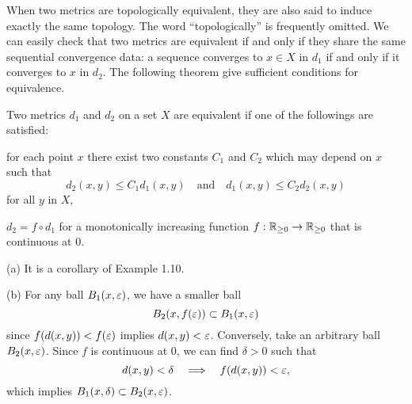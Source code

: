 \documentclass{../note}
\begin{document}
When two metrics are topologically equivalent, they are also said to induce exactly the same topology.
The word ``topologically'' is frequently omitted.
We can easily check that two metrics are equivalent if and only if they share the same sequential convergence data: a sequence converges to $x\in X$ in $d_1$ if and only if it converges to $x$ in $d_2$.
The following theorem give sufficient conditions for equivalence.

\begin{thm}
Two metrics $d_1$ and $d_2$ on a set $X$ are equivalent if one of the followings are satisfied:
\begin{parts}
\item for each point $x$ there exist two constants $C_1$ and $C_2$ which may depend on $x$ such that
\[d_2(x,y)\le C_1d_1(x,y)\quad\text{and}\quad d_1(x,y)\le C_2d_2(x,y)\]
for all $y$ in $X$,
\item $d_2=f\circ d_1$ for a monotonically increasing function $f:\mathbb{R}_{\ge0}\to\mathbb{R}_{\ge0}$ that is continuous at $0$.
\end{parts}
\end{thm}
\begin{pf}
(a)
It is a corollary of Example 1.10.

(b)
For any ball $B_1(x,\varepsilon)$, we have a smaller ball
\[B_2(x,f(\varepsilon))\subset B_1(x,\varepsilon)\]
since $f(d(x,y))<f(\varepsilon)$ implies $d(x,y)<\varepsilon$.
Conversely, take an arbitrary ball $B_2(x,\varepsilon)$.
Since $f$ is continuous at 0, we can find $\delta>0$ such that
\[d(x,y)<\delta\impl f(d(x,y))<\e,\]
which implies $B_1(x,\delta)\subset B_2(x,\varepsilon)$.
\end{pf}

\iffalse
\begin{rmk}
Unlike metrics, there exist two different topologies that have same sequential convergence data.
For example, a sequence in an uncountable set with cocountable topology converges to a point if and only if it is eventually at the point, which is same with discrete topology.
This means the informations of sequence convergence are not sufficient to uniquely characterize a topology.
Instead, convergence data of generalized sequences also called nets, recover the whole topology.
For topologies having a property called the first countability, it is enough to consider only usual sequences in spite of nets.
What we did in this subsection is not useless because topology induced from metric is a typical example of first countable topologies.
These kinds of problems will be profoundly treated in Chapter 3.
\end{rmk}
\begin{rmk}
One can ask some results for the equivalence of metrics characterized by a same set of continuous functions.
However, they are generally difficult problems: is it possible to recover the base space from a continuous function space or a path space?
\end{rmk}
\fi
\end{document}
